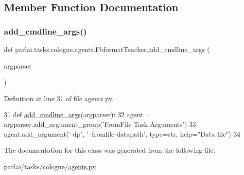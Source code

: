 \subsection{Member Function Documentation}
\mbox{\label{classparlai_1_1tasks_1_1cologne_1_1agents_1_1FbformatTeacher_a05b3cb0bf47e6bb2948f85b03c3bc596}} 
\subsubsection{\texorpdfstring{add\+\_\+cmdline\+\_\+args()}{add\_cmdline\_args()}}
{\footnotesize\ttfamily def parlai.\+tasks.\+cologne.\+agents.\+Fbformat\+Teacher.\+add\+\_\+cmdline\+\_\+args (\begin{DoxyParamCaption}\item[{}]{argparser }\end{DoxyParamCaption})\hspace{0.3cm}{\ttfamily [static]}}



Definition at line 31 of file agents.\+py.


\begin{DoxyCode}
31     \textcolor{keyword}{def }\hyperlink{namespaceparlai_1_1agents_1_1drqa_1_1config_a62fdd5554f1da6be0cba185271058320}{add\_cmdline\_args}(argparser):
32         agent = argparser.add\_argument\_group(\textcolor{stringliteral}{'FromFile Task Arguments'})
33         agent.add\_argument(\textcolor{stringliteral}{'-dp'}, \textcolor{stringliteral}{'--fromfile-datapath'}, type=str, help=\textcolor{stringliteral}{"Data file"})
34 
\end{DoxyCode}


The documentation for this class was generated from the following file\+:\begin{DoxyCompactItemize}
\item 
parlai/tasks/cologne/\hyperlink{parlai_2tasks_2cologne_2agents_8py}{agents.\+py}\end{DoxyCompactItemize}
